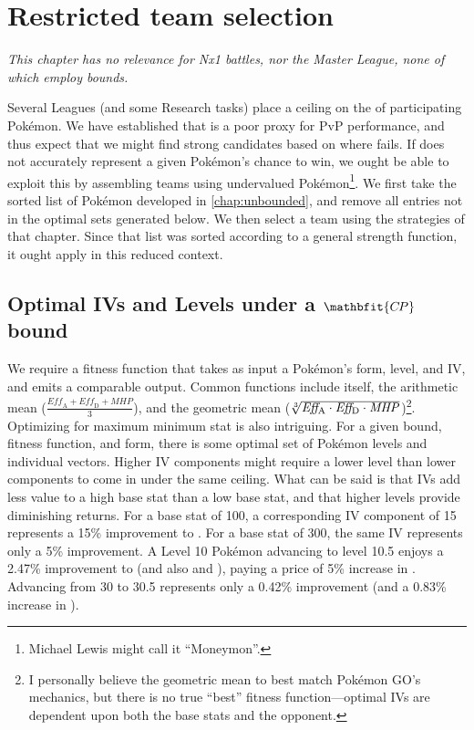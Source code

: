 \chapter{Restricted team selection\label{chap:bounded}}
\textit{This chapter has no relevance for Nx1 battles, nor the Master
  League, none of which employ \CP{} bounds.}
\bigskip

Several Leagues (and some Research tasks) place a ceiling on the \CP{} of
 participating Pokémon.
We have established that \CP{} is a poor proxy for PvP performance, and thus
 expect that we might find strong candidates based on where \CP{} fails.
If \CP{} does not accurately represent a given Pokémon's chance to win, we ought
 be able to exploit this by assembling teams using undervalued Pokémon\footnote{Michael Lewis might call it ``Moneymon''.}.
We first take the sorted list of Pokémon developed in \autoref{chap:unbounded},
 and remove all entries not in the optimal sets generated below.
We then select a team using the strategies of that chapter. Since
 that list was sorted according to a general strength function, it
 ought apply in this reduced context.

\section[Optimal IVs and Levels under a \CP{} bound]%
{Optimal IVs and Levels under a $\mathbfit{C\kern -1ptP}$\, bound}
We require a fitness function that takes as input a Pokémon's form, level, and IV,
  and emits a comparable output.
  Common functions include \CP{} itself, the arithmetic mean ($\frac{\mathit{Eff_\mathrm{A}} +\mathit{Eff_\mathrm{D}} + \mathit{MHP}}{3}$),
  and the geometric mean ($\sqrt[3]{\mbox{$\mathit{Eff_\mathrm{A}}$} \cdot \mbox{$\mathit{Eff_\mathrm{D}}$} \cdot \mbox{$\mathit{MHP}$}}$)\footnote{I personally believe the geometric mean to best match Pokémon GO's
  mechanics, but there is no true ``best'' fitness function---optimal IVs are
  dependent upon both the base stats and the opponent.}.
Optimizing for maximum minimum stat is also intriguing.
For a given \CP{} bound, fitness function, and form, there is some optimal set of Pokémon levels
 and individual vectors.
Higher IV components might require a lower level than lower components to
 come in under the same ceiling.
What can be said is that IVs add less value to a high base stat than a low
 base stat, and that higher levels provide diminishing returns.
For a base stat of 100, a corresponding IV component of 15 represents a
 15\% improvement to .
For a base stat of 300, the same IV represents only a 5\% improvement.
A Level 10 Pokémon advancing to level 10.5 enjoys a 2.47\% improvement to
  (and also  and ), paying a price of 5\% increase
 in \CP{}.
Advancing from 30 to 30.5 represents only a 0.42\% improvement (and a
 0.83\% increase in \CP{}).

